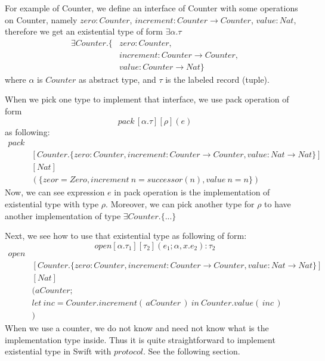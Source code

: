 \documentclass{article}
\begin{document}
For example of Counter, we define an interface of Counter with some operations on Counter, namely $zero: Counter$, $increment: Counter \rightarrow Counter$, $value: Nat$, therefore we get an existential type of form $\exists\alpha.\tau$
\begin{align*}
\exists Counter. \{&zero: Counter, \\
&increment: Counter \rightarrow Counter, \\
&value: Counter \rightarrow Nat\}
\end{align*} 
where $\alpha$ is $Counter$ as abstract type, and $\tau$ is the labeled record (tuple).


When we pick one type to implement that interface, we use pack operation of form
\begin{equation*}
pack\, [\alpha.\tau][\rho](e)
\end{equation*}
 as following:
\begin{align*}
pack & \\
&[Counter. \{zero: Counter, increment: Counter \rightarrow Counter, value: Nat \rightarrow Nat\}] \\
&[Nat]\\
&(\{
zeor = Zero, increment\ n = successor(n), value\ n = n
\})
\end{align*}
Now, we can see expression $e$ in pack operation is the implementation of existential type with type $\rho$. Moreover, we can pick another type for $\rho$ to have another implementation of type $\exists Counter.\{...\}$


Next, we see how to use that existential type as following of form:
\begin{equation*}
open[\alpha.\tau_{1}][\tau_{2}](e_{1};\alpha,x.e_{2}):\tau_{2}
\end{equation*}
\begin{align*}
open & \\
&[Counter. \{zero: Counter, increment: Counter \rightarrow Counter, value: Nat \rightarrow Nat\}] \\
&[Nat]\\
&(aCounter; \\
& let\ inc = Counter.increment(\,aCounter\,)\ in\ Counter.value(\,inc\,)\\
&)
\end{align*}
When we use a counter, we do not know and need not know what is the implementation type inside. Thus it is quite straightforward to implement existential type in Swift with $protocol$. See the following section.
\end{document}
